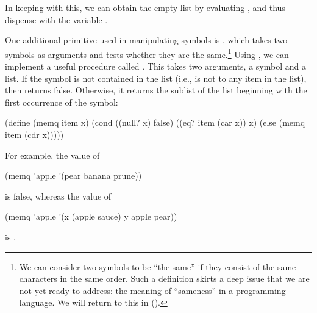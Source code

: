 \noindent
In keeping with this, we can obtain the empty list by evaluating ,
and thus dispense with the variable .

One additional primitive used in manipulating symbols is , which
takes two symbols as arguments and tests whether they are the same.\footnote{We
can consider two symbols to be ``the same'' if they consist of the same
characters in the same order.  Such a definition skirts a deep issue that we
are not yet ready to address: the meaning of ``sameness'' in a programming
language.  We will return to this in  ().}
Using , we can implement a useful procedure called .  This
takes two arguments, a symbol and a list.  If the symbol is not contained in
the list (i.e., is not  to any item in the list), then 
returns false.  Otherwise, it returns the sublist of the list beginning with
the first occurrence of the symbol:

\begin{codeBlock}
(define (memq item x)
  (cond ((null? x) false)
        ((eq? item (car x)) x)
        (else (memq item (cdr x)))))
\end{codeBlock}

\noindent
For example, the value of

\begin{codeBlock}
(memq 'apple '(pear banana prune))
\end{codeBlock}

\noindent
is false, whereas the value of

\begin{codeBlock}
(memq 'apple '(x (apple sauce) y apple pear))
\end{codeBlock}

\noindent
is .


